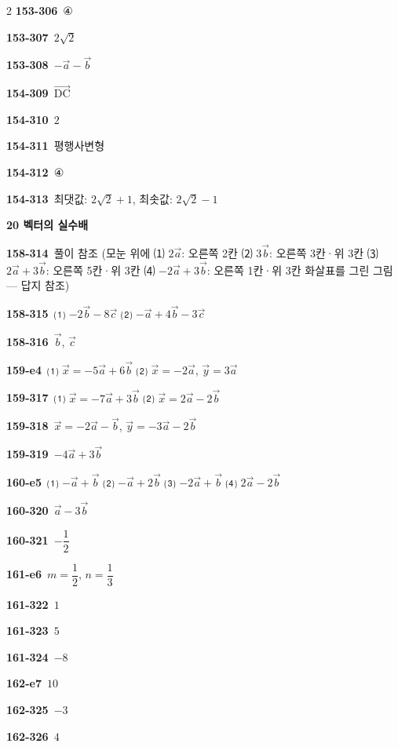 \documentclass[10pt,a4paper]{article}
\newcommand{\pt}[1]{\mathrm{#1}}
\begin{document}
\begin{multicols}{2}
\noindent\textbf{153-306}\ ④\par
\noindent\textbf{153-307}\ $2\sqrt{2}$\par
\noindent\textbf{153-308}\ $-\vec{a}-\vec{b}$\par
\noindent\textbf{154-309}\ $\overrightarrow{\pt{DC}}$\par
\noindent\textbf{154-310}\ $2$\par
\noindent\textbf{154-311}\ 평행사변형\par
\noindent\textbf{154-312}\ ④\par
\noindent\textbf{154-313}\ 최댓값: $2\sqrt{2}+1$, 최솟값: $2\sqrt{2}-1$\par
\noindent\textbf{20 벡터의 실수배}\par\smallskip
\noindent\textbf{158-314}\ 풀이 참조 (모눈 위에 ⑴ $2\vec{a}$: 오른쪽 2칸 ⑵ $3\vec{b}$: 오른쪽 3칸·위 3칸 ⑶ $2\vec{a}+3\vec{b}$: 오른쪽 5칸·위 3칸 ⑷ $-2\vec{a}+3\vec{b}$: 오른쪽 1칸·위 3칸 화살표를 그린 그림 — 답지 참조)\par
\noindent\textbf{158-315}\ ⑴ $-2\vec{b}-8\vec{c}$ ⑵ $-\vec{a}+4\vec{b}-3\vec{c}$\par
\noindent\textbf{158-316}\ $\vec{b}$, $\vec{c}$\par
\noindent\textbf{159-e4}\ ⑴ $\vec{x}=-5\vec{a}+6\vec{b}$ ⑵ $\vec{x}=-2\vec{a}$, $\vec{y}=3\vec{a}$\par
\noindent\textbf{159-317}\ ⑴ $\vec{x}=-7\vec{a}+3\vec{b}$ ⑵ $\vec{x}=2\vec{a}-2\vec{b}$\par
\noindent\textbf{159-318}\ $\vec{x}=-2\vec{a}-\vec{b}$, $\vec{y}=-3\vec{a}-2\vec{b}$\par
\noindent\textbf{159-319}\ $-4\vec{a}+3\vec{b}$\par
\noindent\textbf{160-e5}\ ⑴ $-\vec{a}+\vec{b}$ ⑵ $-\vec{a}+2\vec{b}$ ⑶ $-2\vec{a}+\vec{b}$ ⑷ $2\vec{a}-2\vec{b}$\par
\noindent\textbf{160-320}\ $\vec{a}-3\vec{b}$\par
\noindent\textbf{160-321}\ $-\dfrac{1}{2}$\par
\noindent\textbf{161-e6}\ $m=\dfrac{1}{2}$, $n=\dfrac{1}{3}$\par
\noindent\textbf{161-322}\ $1$\par
\noindent\textbf{161-323}\ $5$\par
\noindent\textbf{161-324}\ $-8$\par
\noindent\textbf{162-e7}\ $10$\par
\noindent\textbf{162-325}\ $-3$\par
\noindent\textbf{162-326}\ $4$\par

\end{multicols}
\end{document}
